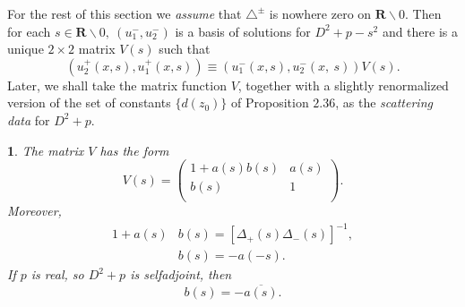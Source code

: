 \documentclass{surv-l}
\theoremstyle{plain}
\newtheorem{prop}[theorem]{\sc{Proposition}}
\theoremstyle{definition}
\numberwithin{equation}{chapter}
\begin{document}
For the rest of this section we \emph{assume} that $\triangle^{\pm}$ is nowhere zero on $\mathbf{R}\backslash 0$. Then for each $s\in \mathbf{R}\backslash 0,\ (u_{1}^{-}, u_{2}^{-})$ is a basis of solutions for $D^{2}+p-s^{2}$ and there is a unique $2\times 2$ matrix $V(s)$ such that
\setcounter{equation}{36}
\begin{equation}\label{eq2.37}
(u_{2}^{+}(x, s), u_{1}^{+}(x, s))\equiv(u_{1}^{-}(x, s), u_{2}^{-}(x,\ s))V(s).
\end{equation}
Later, we shall take the matrix function $V$, together with a slightly renormalized version of the set of constants $\{d(z_{0})\}$ of Proposition $2.36$, as the \emph{scattering data} for $D^{2}+p$.
\setcounter{theorem}{37}
\begin{prop}\label{chap01:prop2.38}
The matrix $V$  has the form
\setcounter{equation}{38}
\begin{equation}\label{eq2.39}
V(s)=\left(
  \begin{array}{cc}
    1+a(s)b(s) & a(s) \\
    b(s) & 1 \\
  \end{array}
\right).
\end{equation}
Moreover,
\begin{align}\label{eq2.40}
1+a(s)&b(s)=[\Delta_{+}(s)\Delta_{-}(s)]^{-1},\\
&b(s)=-a(-s).\label{eq2.41}
\end{align}
If $p$ is real, so $D^{2}+p$ is selfadjoint, then
\begin{equation}\label{eq2.42}
b(s)=-\overline{a(s)}.
\end{equation}
\end{prop}
\end{document}
